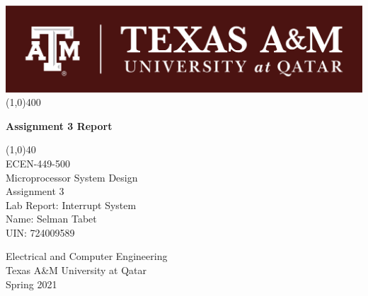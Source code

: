 \begin{titlepage}
\begin{center}
\includegraphics[scale=1.5]{Figures/TAMUQ.png}
\line(1,0){400}\\
[2mm]
\begin{huge}
\textbf{Assignment 3 Report}\\ 
\end{huge}
\begin{LARGE}
\line(1,0){40}\\
[1.5cm]
ECEN-449-500\\
Microprocessor System Design\\
[3cm]
Assignment 3\\
Lab Report: Interrupt System\\ 
[2.5cm]
Name: Selman Tabet\\
UIN: 724009589\\
[4cm]
\end{LARGE}
\begin{large}
Electrical and Computer Engineering\\
Texas A&M University at Qatar\\
Spring 2021
\end{large}
\end{center} 
\end{titlepage}